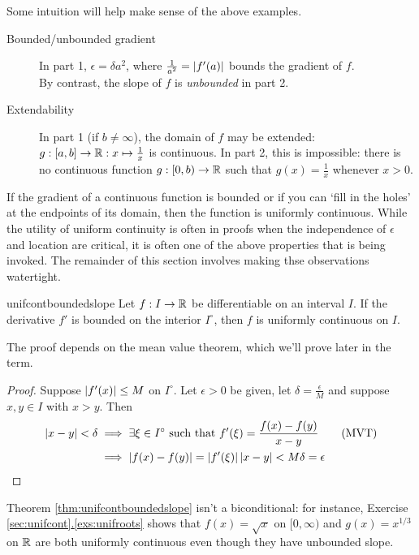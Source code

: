 Some intuition will help make sense of the above examples.
\begin{description}
	\item[Bounded/unbounded gradient] In part 1, $\epsilon=\delta{a^2}$, where $\frac 1{a^2}=\left| f'(a)\right|$ bounds the gradient of $f$.\\
	By contrast, the slope of $f$ is \emph{unbounded} in part 2.
	\item[Extendability] In part 1 (if $b\neq\infty$), the domain of $f$ may be extended: $g:[a,b]\to\mathbb{R}:x\mapsto \frac 1x$ is continuous.
	In part 2, this is impossible: there is no continuous function $g:[0,b)\to\mathbb{R}$ such that $g(x)=\frac 1x$ whenever $x>0$.
\end{description}
If the gradient of a continuous function is bounded or if you can `fill in the holes' at the endpoints of its domain, then the function is uniformly continuous. While the utility of uniform continuity is often in proofs when the independence of $\epsilon$ and location are critical, it is often one of the above properties that is being invoked. The remainder of this section involves making thse observations watertight.

\begin{thm}{}{unifcontboundedslope}
Let $f:I\to\mathbb{R}$ be differentiable on an interval $I$. If the derivative $f'$ is bounded on the interior $I^\circ$, then $f$ is uniformly continuous on $I$.
\end{thm}

The proof depends on the mean value theorem, which we'll prove later in the term.

\begin{proof}
Suppose $\left| f'(x)\right|\le M$ on $I^\circ$. Let $\epsilon>0$ be given, let $\delta=\frac\epsilon M$ and suppose $x,y\in I$ with $x>y$. Then
\begin{align*}
\left| x-y\right|<\delta&\implies \exists \xi\in I^\circ\text{ such that }f'(\xi)=\frac{f(x)-f(y)}{x-y} \tag{MVT}\\
&\implies \left| f(x)-f(y)\right|=\left| f'(\xi)\right|\left| x-y\right|<M\delta=\epsilon \tag*{\qedhere}
\end{align*}
\end{proof}


Theorem \ref{thm:unifcontboundedslope} isn't a biconditional: for instance, Exercise \hyperref[exs:unifroots]{\ref*{sec:unifcont}.\ref*{exs:unifroots}} shows that $f(x)=\sqrt x$ on $[0,\infty)$ and $g(x)=x^{1/3}$ on $\mathbb{R}$ are both uniformly continuous even though they have unbounded slope.\goodbreak

